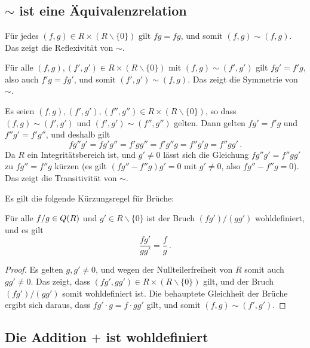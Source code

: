\section{}





\subsection*{$\sim$ ist eine Äquivalenzrelation}

Für jedes $(f,g) \in R \times (R \smallsetminus\{0\})$ gilt $fg = fg$, und somit $(f,g) \sim (f,g)$.
Das zeigt die Reflexivität von $\sim$.

Für alle $(f,g), (f',g') \in R \times (R \smallsetminus\{0\})$ mit $(f,g) \sim (f',g')$ gilt $fg' = f'g$, also auch $f'g = fg'$, und somit $(f', g') \sim (f,g)$.
Das zeigt die Symmetrie von $\sim$.

Es seien $(f,g), (f', g'), (f'', g'') \in R \times (R \smallsetminus\{0\})$, so dass $(f,g) \sim (f',g')$ und $(f',g') \sim (f'', g'')$ gelten.
Dann gelten $fg' = f'g$ und $f''g' = f'g''$, und deshalb gilt
\[
    fg''g'
  = fg'g''
  = f'gg''
  = f'g''g
  = f''g'g
  = f''gg' \,.
\]
Da $R$ ein Integritätsbereich ist, und $g' \neq 0$ lässt sich die Gleichung $fg''g' = f''gg'$ zu $fg'' = f''g$ kürzen (es gilt $(fg'' - f''g)g' = 0$ mit $g' \neq 0$, also $fg'' - f''g = 0$).
Das zeigt die Transitivität von $\sim$.

Es gilt die folgende Kürzungsregel für Brüche:

\begin{lemma}
  \label{lemma: cancelling fractions}
  Für alle $f/g \in Q(R)$ und $g' \in R \smallsetminus \{0\}$ ist der Bruch $(fg')/(gg')$ wohldefiniert, und es gilt
  \[
      \frac{fg'}{gg'}
    = \frac{f}{g} \,.
  \]
\end{lemma}

\begin{proof}
  Es gelten $g, g' \neq 0$, und wegen der Nullteilerfreiheit von $R$ somit auch $g g' \neq 0$.
  Das zeigt, dass $(fg', gg') \in R \times (R \smallsetminus \{0\})$ gilt, und der Bruch $(fg')/(gg')$ somit wohldefiniert ist.
  Die behauptete Gleichheit der Brüche ergibt sich daraus, dass $fg' \cdot g = f \cdot g g'$ gilt, und somit $(f,g) \sim (f',g')$.
\end{proof}





\subsection*{Die Addition $+$ ist wohldefiniert}

